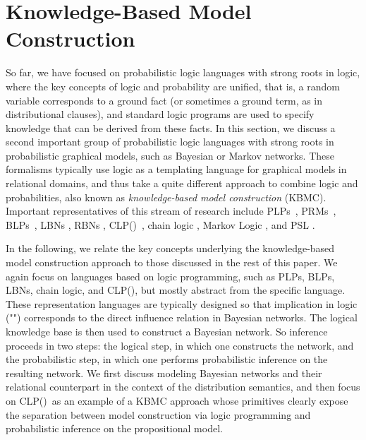 \documentclass[a4paper]{article}
\newcommand{\clpbn}
  {CLP()}
\begin{document}
\section{Knowledge-Based Model Construction}
\label{sec:kbmc-bg}
So far, we have focused on probabilistic logic languages with strong
roots in logic, where the key concepts of logic
and probability are unified, that is, a random variable corresponds to
a ground fact (or sometimes a ground term, as in distributional clauses),
and standard logic programs are used to specify knowledge that can be
derived from these facts. In this section, we discuss a second
important group of probabilistic logic languages with 
strong roots in probabilistic graphical models, such as Bayesian or
Markov networks. These formalisms typically use logic as a templating
language for graphical models in relational domains, and thus take a
quite different approach to combine logic and probabilities, also known as
\emph{knowledge-based model construction} (KBMC). Important
representatives of this stream of research include PLPs~\citep{Haddawy:94}, PRMs~\citep{getoor},
BLPs~\citep{Kersting08}, LBNs \citep{fierens:ilp05}, RBNs
\citep{Jaeger97},  \clpbn~\citep{clpbn}, chain logic
\citep{HommersomLucasECML09}, Markov Logic
\citep{Richardson:06}, and PSL \citep{broecheler:uai10}.  



In the following, we relate the key concepts underlying the
knowledge-based model construction approach to those discussed in the
rest of this paper. We again focus on languages based on logic
programming, such as PLPs, BLPs, LBNs, chain logic, and \clpbn, but mostly abstract from the specific language. These representation languages are typically designed so that 
implication in logic ("") corresponds to the direct influence relation 
in Bayesian networks.  The logical knowledge base is then used
to construct a Bayesian network.  So inference proceeds in two steps: 
the logical step, in which one constructs the network, and the 
probabilistic step, in which one performs probabilistic inference on
the resulting network. We first discuss modeling Bayesian networks and their
relational counterpart in the context of the distribution semantics,
and then focus on \clpbn\ as an example of a KBMC approach whose
primitives clearly expose the separation between model
construction via logic programming and probabilistic inference on the
propositional model. 
\end{document}

